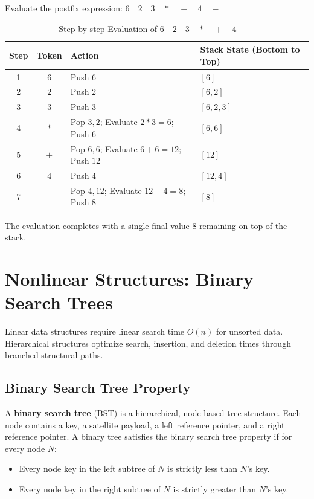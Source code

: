\documentclass[12pt]{report}
\begin{document}
Evaluate the postfix expression: $6 \quad 2 \quad 3 \quad * \quad + \quad 4 \quad -$

\begin{table}[h!]
\centering
\caption{Step-by-step Evaluation of $6 \quad 2 \quad 3 \quad * \quad + \quad 4 \quad -$}
\label{tab:postfix_trace}
\begin{tabularx}{\textwidth}{@{} c c X >{\raggedright\arraybackslash}p{3.8cm} @{}}
\toprule
\textbf{Step} & \textbf{Token} & \textbf{Action} & \textbf{Stack State (Bottom to Top)} \\
\midrule
1 & $6$ & Push $6$ & $[6]$ \\
2 & $2$ & Push $2$ & $[6, 2]$ \\
3 & $3$ & Push $3$ & $[6, 2, 3]$ \\
4 & $*$ & Pop $3, 2$; Evaluate $2 * 3 = 6$; Push $6$ & $[6, 6]$ \\
5 & $+$ & Pop $6, 6$; Evaluate $6 + 6 = 12$; Push $12$ & $[12]$ \\
6 & $4$ & Push $4$ & $[12, 4]$ \\
7 & $-$ & Pop $4, 12$; Evaluate $12 - 4 = 8$; Push $8$ & $[8]$ \\
\bottomrule
\end{tabularx}
\end{table}

The evaluation completes with a single final value $8$ remaining on top of the stack.

\section{Nonlinear Structures: Binary Search Trees}

Linear data structures require linear search time $O(n)$ for unsorted data. Hierarchical structures optimize search, insertion, and deletion times through branched structural paths.

\subsection{Binary Search Tree Property}

A \textbf{binary search tree} (BST) is a hierarchical, node-based tree structure. Each node contains a key, a satellite payload, a left reference pointer, and a right reference pointer. A binary tree satisfies the binary search tree property if for every node $N$:
\begin{itemize}
    \item Every node key in the left subtree of $N$ is strictly less than $N$'s key.
    \item Every node key in the right subtree of $N$ is strictly greater than $N$'s key.
\end{itemize}
\end{document}
